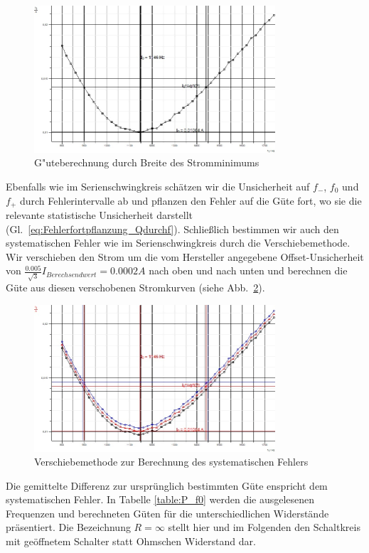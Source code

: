 \documentclass[12pt,a4paper]{article}
\begin{document}
\begin{figure}[H]
	\centering
	\includegraphics[width=0.8\textwidth]{Daten/P100Ohm_f0_1.jpg}
	\caption{G"uteberechnung durch Breite des Stromminimums}
	\label{P100Ohm_f0}
\end{figure}
Ebenfalls wie im Serienschwingkreis schätzen wir die Unsicherheit auf $f_-$, $f_0$ und $f_+$ durch Fehlerintervalle ab und pflanzen den Fehler auf die Güte fort, wo sie die relevante statistische Unsicherheit darstellt (Gl.~\eqref{eq:Fehlerfortpflanzung_Qdurchf}). Schließlich bestimmen wir auch den systematischen Fehler wie im Serienschwingkreis durch die Verschiebemethode. Wir verschieben den Strom um die vom Hersteller angegebene Offset-Unsicherheit von $\frac{0.005}{\sqrt{3}}I_{Berechsendwert}=0.0002A$ nach oben und nach unten und berechnen die Güte aus diesen verschobenen Stromkurven (siehe Abb.~\ref{P100Ohm_f0_sys}).
\begin{figure}[H]
	\centering
	\includegraphics[width=0.8\textwidth]{Daten/P100Ohm_f0.jpg}
	\caption{Verschiebemethode zur Berechnung des systematischen Fehlers}
	\label{P100Ohm_f0_sys}
\end{figure}
Die gemittelte Differenz zur ursprünglich bestimmten Güte enspricht dem systematischen Fehler. In Tabelle \ref{table:P_f0} werden die ausgelesenen Frequenzen und berechneten Güten für die unterschiedlichen Widerstände präsentiert. Die Bezeichnung $R=\infty$ stellt hier und im Folgenden den Schaltkreis mit geöffnetem Schalter statt Ohmschen Widerstand dar.
\end{document}
